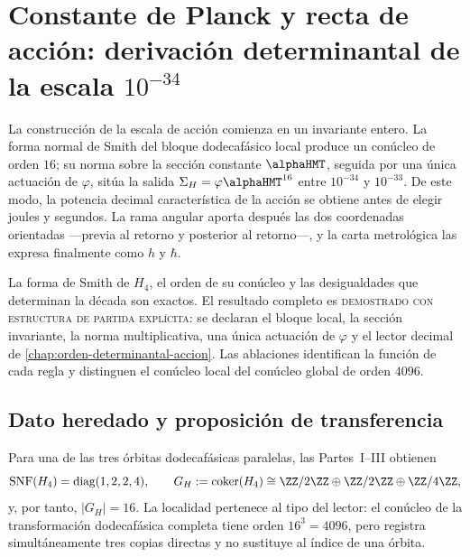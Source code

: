 \chapter[Constante de Planck y escala interna de acción]{Constante de Planck y recta de acción: derivación determinantal de la escala \texorpdfstring{\(10^{-34}\)}{decádica -34}}
\label{chap:escala-accion}

La construcción de la escala de acción comienza en un invariante entero. La
forma normal de Smith del bloque dodecafásico local produce un conúcleo de
orden \(16\); su norma sobre la sección constante \(\alphaHMT\), seguida por
una única actuación de \(\varphi\), sitúa la salida
\(\Sigma_H=\varphi\alphaHMT^{16}\) entre \(10^{-34}\) y \(10^{-33}\). De
este modo, la potencia decimal característica de la acción se obtiene antes
de elegir joules y segundos. La rama angular aporta después las dos
coordenadas orientadas ---previa al retorno y posterior al retorno---, y la
carta metrológica las expresa finalmente como \(h\) y \(\hbar\).

\begin{exactbox}[title={Resultado rector: del conúcleo local a la escala de acción}]
La forma de Smith de \(H_4\), el orden de su conúcleo y las desigualdades que
determinan la década son exactos. El resultado completo es
\textsc{demostrado con estructura de partida explícita}: se declaran el
bloque local, la sección invariante, la norma multiplicativa, una única
actuación de \(\varphi\) y el lector decimal de
\cref{chap:orden-determinantal-accion}. Las ablaciones identifican la función
de cada regla y distinguen el conúcleo local del conúcleo global de orden
\(4096\).
\end{exactbox}

\section{Dato heredado y proposición de transferencia}

Para una de las tres órbitas dodecafásicas paralelas, las Partes~I--III obtienen
\[
\operatorname{SNF}(H_4)=\operatorname{diag}(1,2,2,4),
\qquad
G_H:=\operatorname{coker}(H_4)
\cong\ZZ/2\ZZ\oplus\ZZ/2\ZZ\oplus\ZZ/4\ZZ,
\]
y, por tanto, \(|G_H|=16\). La localidad pertenece al tipo del lector: el
conúcleo de la transformación dodecafásica completa tiene orden
\(16^3=4096\), pero registra simultáneamente tres copias directas y no
sustituye al índice de una órbita.

